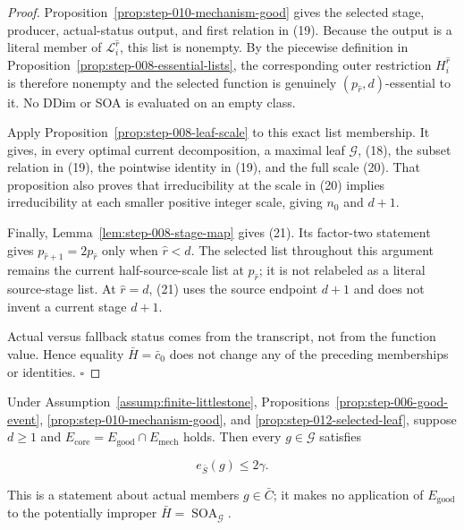 \begin{proof}
Proposition~\ref{prop:step-010-mechanism-good} gives the selected stage,
producer, actual-status output, and first relation in (19). Because the
output is a literal member of \(\mathcal L_i^{\widehat r}\), this list is
nonempty. By the piecewise definition in Proposition~\ref{prop:step-008-essential-lists}, the corresponding outer
restriction \(H_i^{\widehat r}\) is therefore nonempty and the selected
function is genuinely \((p_{\widehat r},d)\)-essential to it. No DDim or
SOA is evaluated on an empty class.

Apply Proposition~\ref{prop:step-008-leaf-scale} to this exact
list membership. It gives, in every optimal current decomposition, a
maximal leaf \(\mathcal G\), (18), the subset relation in (19), the
pointwise identity in (19), and the full scale (20). That proposition also
proves that irreducibility at the scale in (20) implies irreducibility at
each smaller positive integer scale, giving \(n_0\) and \(d+1\).

Finally, Lemma~\ref{lem:step-008-stage-map} gives (21). Its
factor-two statement gives \(p_{\widehat r+1}=2p_{\widehat r}\) only when
\(\widehat r<d\). The selected list throughout this argument remains the
current half-source-scale list at \(p_{\widehat r}\); it is not relabeled
as a literal source-stage list. At \(\widehat r=d\), (21) uses the source
endpoint \(d+1\) and does not invent a current stage \(d+1\).

Actual versus fallback status comes from the  transcript, not from
the function value. Hence equality \(\bar H=\bar c_0\) does not change any
of the preceding memberships or identities. \(\square\)


\end{proof}

\begin{lemma}\label{lem:step-012-leaf-error}
Under Assumption~\ref{assump:finite-littlestone},
Propositions~\ref{prop:step-006-good-event},
\ref{prop:step-010-mechanism-good}, and
\ref{prop:step-012-selected-leaf}, suppose \(d\ge1\) and
\(E_{\mathrm{core}}=E_{\mathrm{good}}\cap E_{\mathrm{mech}}\) holds. Then
every \(g\in\mathcal G\) satisfies

\[
 e_{\bar S}(g)\le2\gamma.
\tag{22}
\]

This is a statement about actual members \(g\in\bar C\); it makes no
application of \(E_{\mathrm{good}}\) to the potentially improper
\(\bar H=\operatorname{SOA}_{\mathcal G}\).


\end{lemma}

